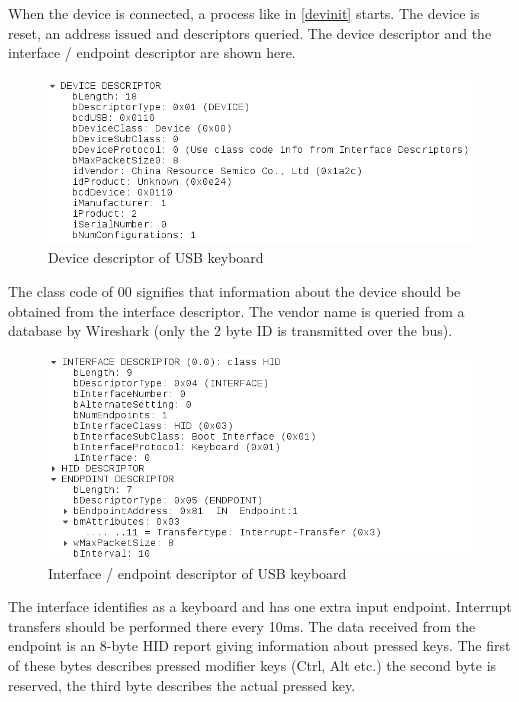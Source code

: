 \documentclass{article}
\begin{document}
When the device is connected, a process like in \autoref{devinit} starts.
The device is reset, an address issued and descriptors queried. The device
descriptor and the interface / endpoint descriptor are shown here.

\begin{figure}[H]
  \caption{Device descriptor of USB keyboard}
  \centering
  \includegraphics[width=\textwidth]{images/keyboard_sniff1.png}
\end{figure}

The class code of 00 signifies that information about the device should be
obtained from the interface descriptor. The vendor name is queried
from a database by Wireshark (only the 2 byte ID is transmitted over the bus).

\begin{figure}[H]
  \caption{Interface / endpoint descriptor of USB keyboard}
  \centering
  \includegraphics[width=\textwidth]{images/keyboard_sniff2.png}
\end{figure}

The interface identifies as a keyboard and has one extra input endpoint.
Interrupt transfers should be performed there every 10ms.
The data received from the endpoint is an 8-byte HID report giving information
about pressed keys. The first of these bytes describes pressed modifier keys
(Ctrl, Alt etc.) the second byte is reserved, the third byte describes the
actual pressed key. \cite{usbhid}
\end{document}
